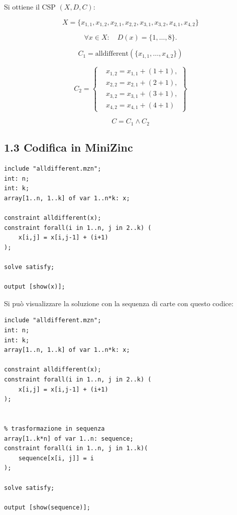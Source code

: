 \documentclass[a4paper,11pt]{article}
\begin{document}
Si ottiene il CSP $(X,D,C)$:

\[
X = \{
x_{1,1}, x_{1,2}, x_{2,1}, x_{2,2}, x_{3,1}, x_{3,2}, x_{4,1}, x_{4,2}
\}
\]

\[
\forall x \in X:\quad D(x)=\{1, \ldots, 8\}.
\]

\[
C_1 = \text{alldifferent}(\{x_{1,1}, \ldots, x_{4,2}\})
\]

\[
C_2 = \left\{
\begin{aligned}
&x_{1,2} = x_{1,1} + (1+1),\\
&x_{2,2} = x_{2,1} + (2+1),\\
&x_{3,2} = x_{3,1} + (3+1),\\
&x_{4,2} = x_{4,1} + (4+1)
\end{aligned}
\right\}
\]

\[
C = C_1 \land C_2
\]

\newpage

\subsection*{1.3 Codifica in MiniZinc}
\begin{lstlisting}
include "alldifferent.mzn";
int: n;
int: k;
array[1..n, 1..k] of var 1..n*k: x;

constraint alldifferent(x);
constraint forall(i in 1..n, j in 2..k) (
    x[i,j] = x[i,j-1] + (i+1)
);

solve satisfy;

output [show(x)];
\end{lstlisting}

Si può visualizzare la soluzione con la sequenza di carte con questo codice:

\begin{lstlisting}
include "alldifferent.mzn";
int: n;
int: k;
array[1..n, 1..k] of var 1..n*k: x;

constraint alldifferent(x);
constraint forall(i in 1..n, j in 2..k) (
    x[i,j] = x[i,j-1] + (i+1)
);
 

% trasformazione in sequenza
array[1..k*n] of var 1..n: sequence;
constraint forall(i in 1..n, j in 1..k)(
    sequence[x[i, j]] = i
);

solve satisfy;

output [show(sequence)];
\end{lstlisting}
\end{document}
